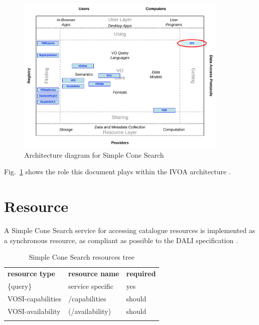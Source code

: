 \documentclass[11pt,a4paper]{ivoa}
\begin{document}
\begin{figure}
\centering


\includegraphics[width=0.9\textwidth]{role_diagram.pdf}
\caption{Architecture diagram for Simple Cone Search}
\label{fig:archdiag} 
\end{figure}

Fig.~\ref{fig:archdiag} shows the role this document plays within the
IVOA architecture \citep{note:VOARCH}.

\section{Resource}
\label{sec:resif}

A Simple Cone Search service for accessing catalogue resources is
implemented as a synchronous resource, as compliant as possible to the
DALI specification \citep{std:DALI}.

\begin{table}[th] 
\begin{center}
\begin{tabular}{p{}p{}p{}}
\sptablerule \textbf{resource type}&\textbf{resource name}&\textbf{required}\\ 
\sptablerule \{query\} & service specific & yes\\ VOSI-capabilities & /capabilities & should\\ VOSI-availability & (/availability) & should\\ 
\sptablerule 
\label{table:resources} 
\end{tabular} 
\caption{Simple Cone Search resources tree} 
\end{center}
\end{table}
\end{document}
